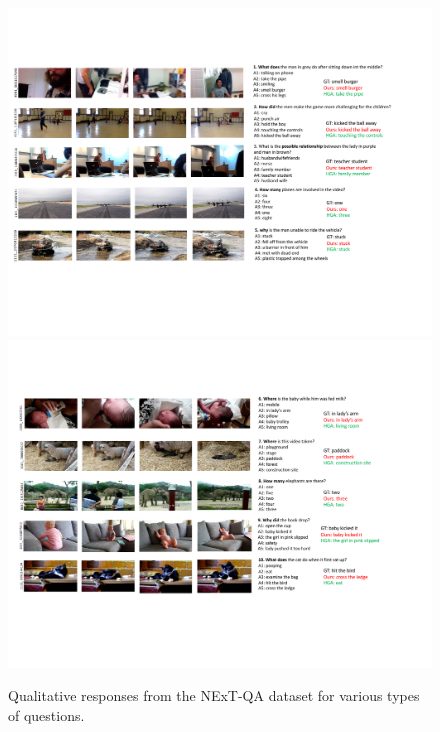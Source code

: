 \documentclass[letterpaper]{article}
\begin{document}
\begin{figure}
    \centering
    \includegraphics[width=20cm,trim={0cm 5cm 1.5cm 3cm},clip]{./figs/quals_results_suppl.pdf}
    \includegraphics[width=20cm,trim={0.5cm 5cm 1.5cm 3cm},clip]{./figs/quals_results_suppl_2.pdf}
    \caption{Qualitative responses from the NExT-QA dataset for various types of questions.}
    \label{fig:next-qa-more-quals-x}
\end{figure}
\end{document}
